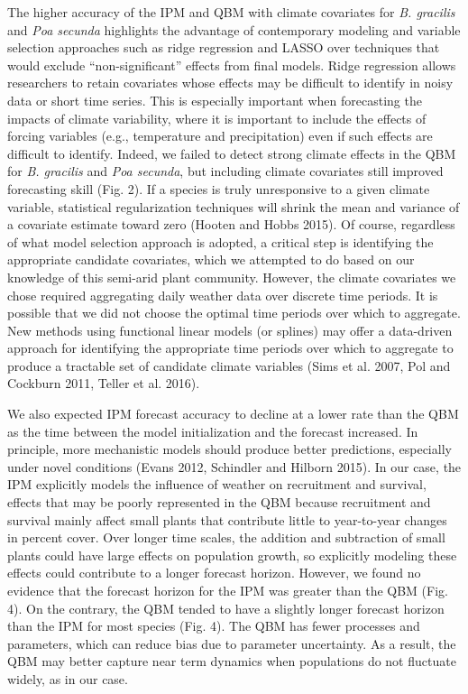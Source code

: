 \documentclass[12pt,]{article}
\begin{document}
The higher accuracy of the IPM and QBM with climate covariates for
\emph{B. gracilis} and \emph{Poa secunda} highlights the advantage of
contemporary modeling and variable selection approaches such as ridge
regression and LASSO over techniques that would exclude
``non-significant'' effects from final models. Ridge regression allows
researchers to retain covariates whose effects may be difficult to
identify in noisy data or short time series. This is especially
important when forecasting the impacts of climate variability, where it
is important to include the effects of forcing variables (e.g.,
temperature and precipitation) even if such effects are difficult to
identify. Indeed, we failed to detect strong climate effects in the QBM
for \emph{B. gracilis} and \emph{Poa secunda}, but including climate
covariates still improved forecasting skill (Fig. 2). If a species is
truly unresponsive to a given climate variable, statistical
regularization techniques will shrink the mean and variance of a
covariate estimate toward zero (Hooten and Hobbs 2015). Of course,
regardless of what model selection approach is adopted, a critical step
is identifying the appropriate candidate covariates, which we attempted
to do based on our knowledge of this semi-arid plant community. However,
the climate covariates we chose required aggregating daily weather data
over discrete time periods. It is possible that we did not choose the
optimal time periods over which to aggregate. New methods using
functional linear models (or splines) may offer a data-driven approach
for identifying the appropriate time periods over which to aggregate to
produce a tractable set of candidate climate variables (Sims et al.
2007, Pol and Cockburn 2011, Teller et al. 2016).

We also expected IPM forecast accuracy to decline at a lower rate than
the QBM as the time between the model initialization and the forecast
increased. In principle, more mechanistic models should produce better
predictions, especially under novel conditions (Evans 2012, Schindler
and Hilborn 2015). In our case, the IPM explicitly models the influence
of weather on recruitment and survival, effects that may be poorly
represented in the QBM because recruitment and survival mainly affect
small plants that contribute little to year-to-year changes in percent
cover. Over longer time scales, the addition and subtraction of small
plants could have large effects on population growth, so explicitly
modeling these effects could contribute to a longer forecast horizon.
However, we found no evidence that the forecast horizon for the IPM was
greater than the QBM (Fig. 4). On the contrary, the QBM tended to have a
slightly longer forecast horizon than the IPM for most species (Fig. 4).
The QBM has fewer processes and parameters, which can reduce bias due to
parameter uncertainty. As a result, the QBM may better capture near term
dynamics when populations do not fluctuate widely, as in our case.
\end{document}
